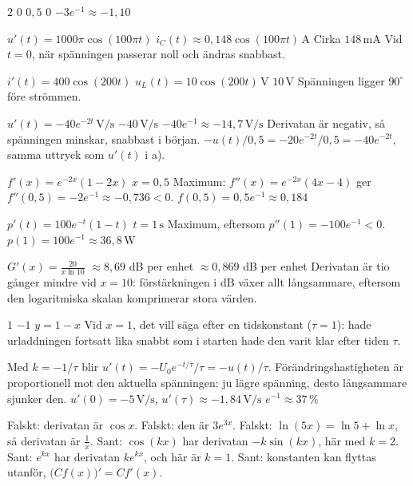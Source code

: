 \begin{facit}
  $2$  $0$  $0{,}5$  $0$  $-3e^{-1} \approx -1{,}10$

  $u'(t) = 1000\pi\cos(100\pi t)$
 $i_C(t) \approx 0{,}148\cos(100\pi t)\,\text{A}$  Cirka $148\,\text{mA}$
 Vid $t = 0$, när spänningen passerar noll och ändras snabbast.

  $i'(t) = 400\cos(200t)$  $u_L(t) = 10\cos(200t)\,\text{V}$
 $10\,\text{V}$  Spänningen ligger $90^{\circ}$ före strömmen.

  $u'(t) = -40e^{-2t}\,\text{V/s}$  $-40\,\text{V/s}$
 $-40e^{-1} \approx -14{,}7\,\text{V/s}$
 Derivatan är negativ, så spänningen minskar, snabbast i början.
 $-u(t)/0{,}5 = -20e^{-2t}/0{,}5 = -40e^{-2t}$, samma uttryck som $u'(t)$ i a).

  $f'(x) = e^{-2x}(1 - 2x)$  $x = 0{,}5$
 Maximum: $f''(x) = e^{-2x}(4x - 4)$ ger $f''(0{,}5) = -2e^{-1} \approx -0{,}736 < 0$.
 $f(0{,}5) = 0{,}5e^{-1} \approx 0{,}184$

  $p'(t) = 100e^{-t}(1 - t)$  $t = 1\,\text{s}$
 Maximum, eftersom $p''(1) = -100e^{-1} < 0$.
 $p(1) = 100e^{-1} \approx 36{,}8\,\text{W}$

  $G'(x) = \frac{20}{x \ln 10}$  $\approx 8{,}69$ dB per enhet
 $\approx 0{,}869$ dB per enhet
 Derivatan är tio gånger mindre vid $x = 10$: förstärkningen i dB växer allt långsammare,
eftersom den logaritmiska skalan komprimerar stora värden.

  $1$  $-1$  $y = 1 - x$
 Vid $x = 1$, det vill säga efter en tidskonstant ($\tau = 1$): hade urladdningen fortsatt
lika snabbt som i starten hade den varit klar efter tiden $\tau$.

  Med $k = -1/\tau$ blir $u'(t) = -U_0e^{-t/\tau}/\tau = -u(t)/\tau$.
 Förändringshastigheten är proportionell mot den aktuella spänningen: ju lägre spänning,
desto långsammare sjunker den.
 $u'(0) = -5\,\text{V/s}$, $u'(\tau) \approx -1{,}84\,\text{V/s}$
 $e^{-1} \approx 37\,\%$

  Falskt: derivatan är $\cos x$.  Falskt: den är $3e^{3x}$.
 Falskt: $\ln(5x) = \ln 5 + \ln x$, så derivatan är $\frac{1}{x}$.
 Sant: $\cos(kx)$ har derivatan $-k\sin(kx)$, här med $k = 2$.
 Sant: $e^{kx}$ har derivatan $ke^{kx}$, och här är $k = 1$.
 Sant: konstanten kan flyttas utanför, $\bigl(Cf(x)\bigr)' = Cf'(x)$.


\end{facit}
